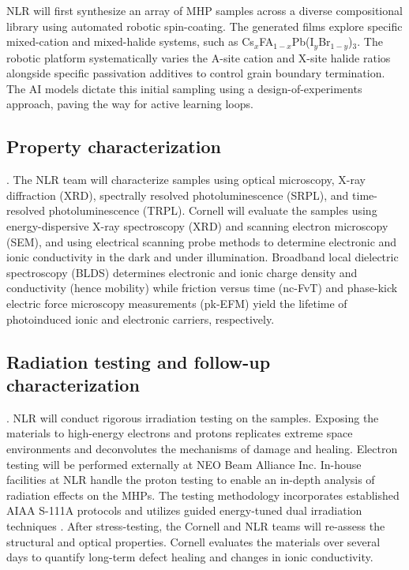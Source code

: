 \documentclass[pgs]{DOE}
\begin{document}
NLR will first synthesize an array of MHP samples across a diverse compositional library using automated robotic spin-coating. 
The generated films explore specific mixed-cation and mixed-halide systems, such as Cs$_{x}$FA$_{1-x}$Pb(I$_{y}$Br$_{1-y}$)$_3$.
The robotic platform systematically varies the A-site cation and X-site halide ratios alongside specific passivation additives to control grain boundary termination. 
The AI models dictate this initial sampling using a design-of-experiments approach, paving the way for active learning loops.

\subsection{Property characterization}.
The NLR team will characterize samples using optical microscopy, X-ray diffraction (XRD), spectrally resolved photoluminescence (SRPL), and time-resolved photoluminescence (TRPL). 
Cornell will evaluate the samples using energy-dispersive X-ray spectroscopy (XRD) and scanning electron microscopy (SEM), and  using electrical scanning probe methods to determine electronic and ionic conductivity in the dark and under illumination.
Broadband local dielectric spectroscopy (BLDS) determines electronic and ionic charge density and conductivity (hence mobility) while friction versus time (nc-FvT) and phase-kick electric force microscopy measurements (pk-EFM) yield the lifetime of photoinduced ionic and electronic carriers, respectively.

\subsection{Radiation testing and follow-up characterization}.  
NLR will conduct rigorous irradiation testing on the samples. 
Exposing the materials to high-energy electrons and protons replicates extreme space environments and deconvolutes the mechanisms of damage and healing. 
Electron testing will be performed externally at NEO Beam Alliance Inc. 
In-house facilities at NLR handle the proton testing to enable an in-depth analysis of radiation effects on the MHPs. 
The testing methodology incorporates established AIAA S-111A protocols \cite{AIAA2014, hanAdvancingPerovskiteSolar2025} and utilizes guided energy-tuned dual irradiation techniques \cite{kirmaniUnravelingRadiationDamage2024, kirmaniCountdownPerovskiteSpace2022}.
After stress-testing, the Cornell and NLR teams will re-assess the structural and optical properties. 
Cornell evaluates the materials over several days to quantify long-term defect healing and changes in ionic conductivity.
\end{document}
